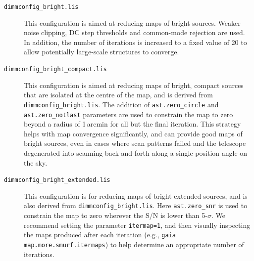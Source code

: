 \documentclass[twoside,11pt]{starlink}
\begin{document}
\begin{description}
\item[\texttt{dimmconfig\_bright.lis}]\quad This configuration is
  aimed at reducing maps of bright sources. Weaker noise clipping, DC
  step thresholds and common-mode rejection are used. In addition, the
  number of iterations is increased to a fixed value of 20 to allow
  potentially large-scale structures to converge.

\item[\texttt{dimmconfig\_bright\_compact.lis}]\quad This
  configuration is aimed at reducing maps of bright, compact sources
  that are isolated at the centre of the map, and is derived from
  \texttt{dimmconfig\_bright.lis}. The addition of
  \texttt{ast.zero\_circle} and \texttt{ast.zero\_notlast} parameters
  are used to constrain the map to zero beyond a radius of 1\,arcmin
  for all but the final iteration. This strategy helps with map
  convergence significantly, and can provide good maps of bright
  sources, even in cases where scan patterns failed and the telescope
  degenerated into scanning back-and-forth along a single position
  angle on the sky.

\item[\texttt{dimmconfig\_bright\_extended.lis}]\quad This
  configuration is for reducing maps of bright extended sources, and
  is also derived from \texttt{dimmconfig\_bright.lis}. Here
  \texttt{ast.zero\_snr} is used to constrain the map to zero wherever
  the S/N is lower than 5-$\sigma$. We recommend setting the parameter
  \texttt{itermap=1}, and then visually inspecting the maps produced
  after each iteration (e.g., \texttt{gaia map.more.smurf.itermaps})
  to help determine an appropriate number of iterations.




\end{description}
\end{document}

